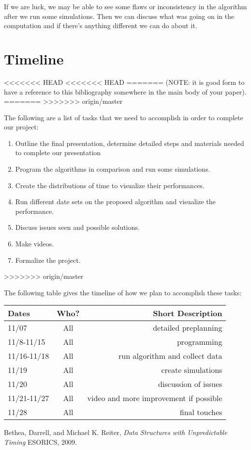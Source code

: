 \documentclass[11pt,twocolumn]{article}
\begin{document}
If we are luck, we may be able to see some flaws or inconsistency in the algorithm after we run some simulations. Then we can discuss what was going on in the computation and if there's anything different we can do about it.


%
% 

\newpage
\onecolumn
\appendix
\section{Timeline}
<<<<<<< HEAD
<<<<<<< HEAD
=======
(NOTE: it is good form to have a reference to this bibliography somewhere in 
the main body of your paper).
=======
>>>>>>> origin/master

The following are a list of tasks that we need to accomplish in order to 
complete our project:

\begin{enumerate}
\item Outline the final presentation, determine detailed steps and
materials needed to complete our presentation

\item Program the algorithms in comparison and run some simulations.

\item Create the distributions of time to visualize their performances.

\item Run different date sets on the proposed algorithm and visualize the performance.

\item Discuss issues seen and possible solutions.

\item Make videos.

\item Formalize the project.
\end{enumerate}
>>>>>>> origin/master

The following table gives the timeline of how we plan to accomplish these tasks:

\begin{table}[h!]
\centering
\begin{tabular}{ |l | c | r|}
  \hline
  Dates & Who? & Short Description \\
  \hline
  \hline
  
  \hline
  11/07 & All & detailed preplanning \\
  \hline
  11/8-11/15 & All & programming \\
  \hline
  11/16-11/18 & All & run algorithm and collect data \\
  \hline
  11/19 & All & create simulations \\
  \hline
  11/20 & All & discussion of issues \\
  \hline
  11/21-11/27 & All & video and more improvement if possible \\
  \hline
  11/28 & All & final touches \\
  \hline
\end{tabular}
\end{table}

\pagebreak

\begin{thebibliography}{9}
	
	Bethea, Darrell, and Michael K. Reiter,
	\emph{Data Structures with Unpredictable Timing}
	ESORICS,
	2009.
	
\end{thebibliography}
\end{document}

